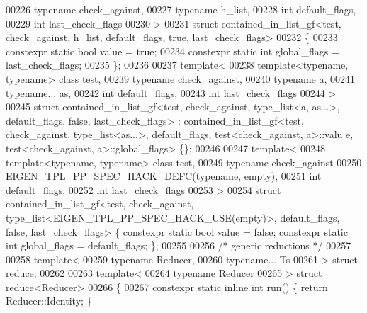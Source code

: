\begin{DoxyCode}
00226   \textcolor{keyword}{typename} check\_against,
00227   \textcolor{keyword}{typename} h\_list,
00228   \textcolor{keywordtype}{int} default\_flags,
00229   \textcolor{keywordtype}{int} last\_check\_flags
00230 >
00231 \textcolor{keyword}{struct }contained\_in\_list\_gf<test, check\_against, h\_list, default\_flags, true, last\_check\_flags>
00232 \{
00233   constexpr \textcolor{keyword}{static} \textcolor{keywordtype}{bool} value = \textcolor{keyword}{true};
00234   constexpr \textcolor{keyword}{static} \textcolor{keywordtype}{int} global\_flags = last\_check\_flags;
00235 \};
00236 
00237 \textcolor{keyword}{template}<
00238   \textcolor{keyword}{template}<\textcolor{keyword}{typename}, \textcolor{keyword}{typename}> \textcolor{keyword}{class }test,
00239   \textcolor{keyword}{typename} check\_against,
00240   \textcolor{keyword}{typename} a,
00241   \textcolor{keyword}{typename}... as,
00242   \textcolor{keywordtype}{int} default\_flags,
00243   \textcolor{keywordtype}{int} last\_check\_flags
00244 >
00245 \textcolor{keyword}{struct }contained\_in\_list\_gf<test, check\_against, type\_list<a, as...>, default\_flags, false, 
      last\_check\_flags> : contained\_in\_list\_gf<test, check\_against, type\_list<as...>, default\_flags, test<check\_against, a>::valu
      e, test<check\_against, a>::global\_flags> \{\};
00246 
00247 \textcolor{keyword}{template}<
00248   \textcolor{keyword}{template}<\textcolor{keyword}{typename}, \textcolor{keyword}{typename}> \textcolor{keyword}{class }test,
00249   \textcolor{keyword}{typename} check\_against
00250   EIGEN\_TPL\_PP\_SPEC\_HACK\_DEFC(\textcolor{keyword}{typename}, empty),
00251   \textcolor{keywordtype}{int} default\_flags,
00252   \textcolor{keywordtype}{int} last\_check\_flags
00253 >
00254 \textcolor{keyword}{struct }contained\_in\_list\_gf<test, check\_against, type\_list<EIGEN\_TPL\_PP\_SPEC\_HACK\_USE(empty)>, 
      default\_flags, false, last\_check\_flags> \{ constexpr \textcolor{keyword}{static} \textcolor{keywordtype}{bool} value = \textcolor{keyword}{false}; constexpr \textcolor{keyword}{static} \textcolor{keywordtype}{int} global\_flags = 
      default\_flags; \};
00255 
00256 \textcolor{comment}{/* generic reductions */}
00257 
00258 \textcolor{keyword}{template}<
00259   \textcolor{keyword}{typename} Reducer,
00260   \textcolor{keyword}{typename}... Ts
00261 > \textcolor{keyword}{struct }reduce;
00262 
00263 \textcolor{keyword}{template}<
00264   \textcolor{keyword}{typename} Reducer
00265 > \textcolor{keyword}{struct }reduce<Reducer>
00266 \{
00267   constexpr \textcolor{keyword}{static} \textcolor{keyword}{inline} \textcolor{keywordtype}{int} run() \{ \textcolor{keywordflow}{return} Reducer::Identity; \}

\end{DoxyCode}
